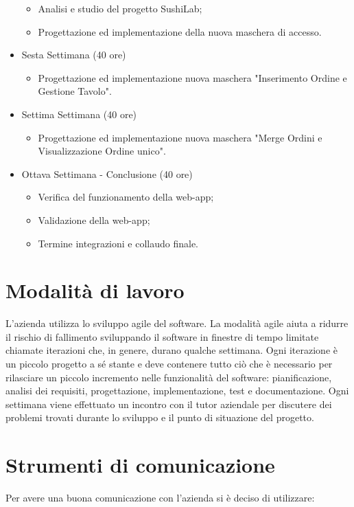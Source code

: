 \begin{itemize}
        \begin{itemize}
        \item Analisi e studio del progetto SushiLab;
        \item Progettazione ed implementazione della nuova maschera di accesso.
        \end{itemize}
    \item Sesta Settimana (40 ore)
    \begin{itemize}
        \item Progettazione ed implementazione nuova maschera "Inserimento Ordine e Gestione Tavolo".
    \end{itemize}
    \item Settima Settimana (40 ore)
    \begin{itemize}
        \item Progettazione ed implementazione nuova maschera "Merge Ordini e Visualizzazione Ordine unico".
    \end{itemize}
    \item Ottava Settimana - Conclusione (40 ore)
    \begin{itemize}
        \item Verifica del funzionamento della web-app;
        \item Validazione della web-app;
        \item Termine integrazioni e collaudo finale.
    \end{itemize}
\end{itemize}
\section{Modalità di lavoro}
L'azienda utilizza lo sviluppo agile del software. La modalità agile aiuta a ridurre il rischio di fallimento sviluppando il software in finestre di tempo limitate chiamate iterazioni che, in genere, durano qualche settimana. Ogni iterazione è un piccolo progetto a sé stante e deve contenere tutto ciò che è necessario per rilasciare un piccolo incremento nelle funzionalità del software: pianificazione, analisi dei requisiti, progettazione, implementazione, test e documentazione. Ogni settimana viene effettuato un incontro con il tutor aziendale per discutere dei problemi trovati durante lo sviluppo e il punto di situazione del progetto.
\section{Strumenti di comunicazione}
Per avere una buona comunicazione con l'azienda si è deciso di utilizzare:
